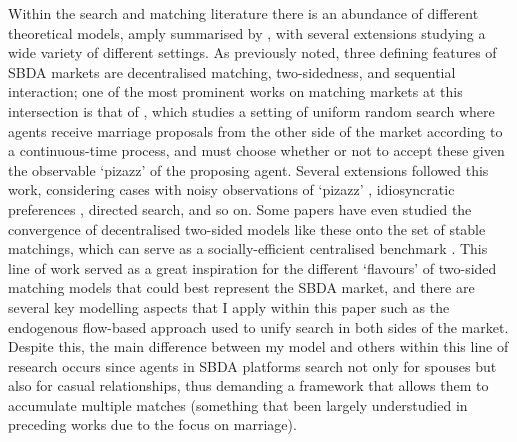 Within the search and matching literature there is an abundance of different theoretical models, amply summarised by \cite{chade2017sorting}, with several extensions studying a wide variety of different settings.
As previously noted, three defining features of SBDA markets are decentralised matching, two-sidedness, and sequential interaction; one of the most prominent works on matching markets at this intersection is that of \cite{burdett1997marriage}, which studies a setting of uniform random search where agents receive marriage proposals from the other side of the market according to a continuous-time process, and must choose whether or not to accept these given the observable `pizazz' of the proposing agent.
Several extensions followed this work, considering cases with noisy observations of `pizazz' \citep{chade2006matching}, idiosyncratic preferences \citep{burdett1998two}, directed search, and so on. Some papers have even studied the convergence of decentralised two-sided models like these onto the set of stable matchings, which can serve as a socially-efficient centralised benchmark \citep{adachi2003search}.
This line of work served as a great inspiration for the different `flavours' of two-sided matching models that could best represent the SBDA market, and there are several key modelling aspects that I apply within this paper such as the endogenous flow-based approach used to unify search in both sides of the market.
Despite this, the main difference between my model and others within this line of research occurs since agents in SBDA platforms search not only for spouses but also for casual relationships, thus demanding a framework that allows them to accumulate multiple matches (something that been largely understudied in preceding works due to the focus on marriage).

